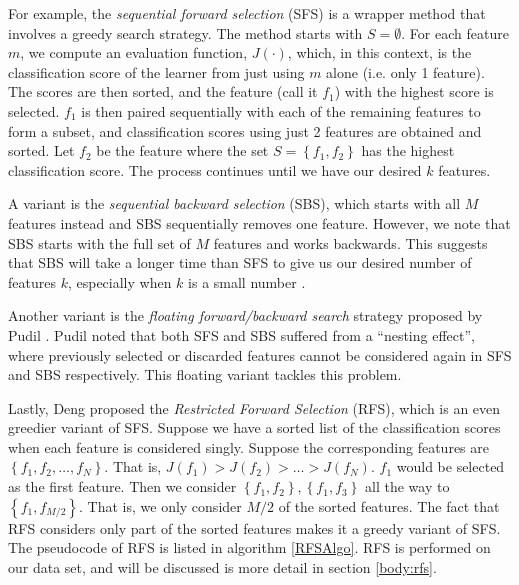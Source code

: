 \documentclass[12pt, twoside, a4paper]{report}
\begin{document}
For example, the \textit{sequential forward selection} (SFS) \cite{RefWorks:177} is a wrapper method that involves a greedy search strategy. The method starts with $S=\emptyset$. For each feature $m$, we compute an evaluation function, $J(\cdot)$, which, in this context, is the classification score of the learner from just using $m$ alone (i.e. only 1 feature). The scores are then sorted, and the feature (call it $f_1$) with the highest score is selected. $f_1$ is then paired sequentially with each of the remaining features to form a subset, and classification scores using just 2 features are obtained and sorted. Let $f_2$ be the feature where the set $S= \left\lbrace f_1, f_2 \right\rbrace$ has the highest classification score. The process continues until we have our desired $k$ features.
  
A variant is the \textit{sequential backward selection} (SBS), which starts with all $M$ features instead and SBS sequentially removes one feature. However, we note that SBS starts with the full set of $M$ features and works backwards. This suggests that SBS will take a longer time than SFS to give us our desired number of features $k$, especially when $k$ is a small number \cite{RefWorks:190}.

Another variant is the \textit{floating forward/backward search} strategy proposed by Pudil \cite{RefWorks:178}. Pudil noted that both SFS and SBS suffered from a ``nesting effect'', where previously selected or discarded features cannot be considered again in SFS and SBS respectively. This floating variant tackles this problem.

Lastly, Deng \cite{deng1998omega} proposed the \textit{Restricted Forward Selection} (RFS), which is an even greedier variant of SFS. Suppose we have a sorted list of the classification scores when each feature is considered singly. Suppose the corresponding features are $\left\lbrace f_1, f_2, \dots , f_N \right\rbrace$. That is, $J(f_1) > J(f_2) > \dots > J(f_N)$. $f_1$ would be selected as the first feature. Then we consider $\left\lbrace f_1, f_2 \right\rbrace, \left\lbrace f_1, f_3 \right\rbrace$ all the way to $\left\lbrace f_1, f_{M/2} \right\rbrace$. That is, we only consider $M/2$ of the sorted features. The fact that RFS considers only part of the sorted features makes it a greedy variant of SFS. The pseudocode of RFS is listed in algorithm \ref{RFSAlgo}. RFS is performed on our data set, and will be discussed is more detail in section \ref{body:rfs}.
\end{document}

